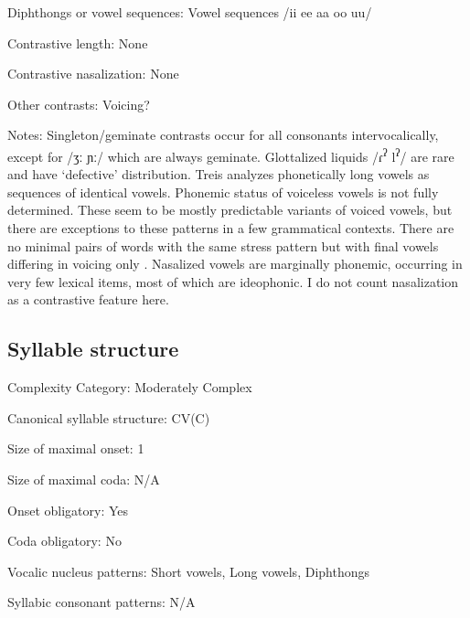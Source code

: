 {\begin{appendixdesc}
\item[Diphthongs or vowel sequences:] Vowel sequences /ii ee aa oo uu/

\item[Contrastive length:] None

\item[Contrastive nasalization:] None

\item[Other contrasts:] Voicing?

\item[Notes:] Singleton/geminate contrasts occur for all consonants intervocalically, except for /ʒː ɲː/ which are always geminate. Glottalized liquids /ɾ\textsuperscript{ʔ} l\textsuperscript{ʔ}/ are rare and have ‘defective’ distribution. Treis analyzes phonetically long vowels as sequences of identical vowels. Phonemic status of voiceless vowels is not fully determined. These seem to be mostly predictable variants of voiced vowels, but there are exceptions to these patterns in a few grammatical contexts. There are no minimal pairs of words with the same stress pattern but with final vowels differing in voicing only \citep[20--22]{Treis2008}. Nasalized vowels are marginally phonemic, occurring in very few lexical items, most of which are ideophonic. I do not count nasalization as a contrastive feature here.
\end{appendixdesc}
\subsection*{Syllable structure}
\begin{appendixdesc}

\item[Complexity Category:] Moderately Complex

\item[Canonical syllable structure:] CV(C) \citep[41]{Treis2008}

\item[Size of maximal onset:] 1

\item[Size of maximal coda:] N/A

\item[Onset obligatory:] Yes

\item[Coda obligatory:] No

\item[Vocalic nucleus patterns:] Short vowels, Long vowels, Diphthongs

\item[Syllabic consonant patterns:] N/A


\end{appendixdesc}}
